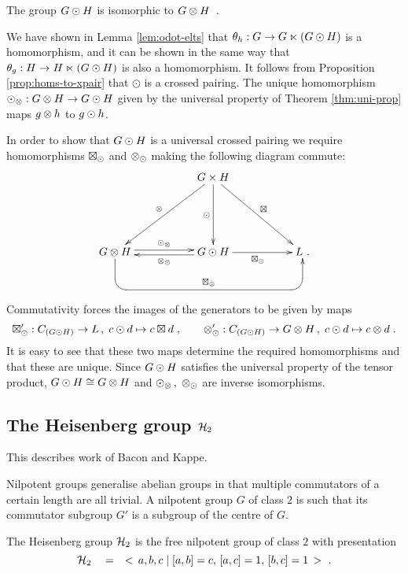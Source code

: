 \begin{thm}
The group  $G \odot H$  is isomorphic to  $G \otimes H$~.
\end{thm}
\begin{pf}
We have shown in Lemma \ref{lem:odot-elts} that  
$\theta_h : G \to G \ltimes (G \odot H)$  is a homomorphism,
and it can be shown in the same way that  
$\theta_g : H \to H \ltimes (G \odot H)$  is also a homomorphism.  
It follows from Proposition \ref{prop:homs-to-xpair}
that  $\odot$  is a crossed pairing.
The unique homomorphism  $\odot_{\otimes} : G \otimes H \to G \odot H$
given by the universal property of Theorem \ref{thm:uni-prop}
maps  $g \otimes h$  to  $g \odot h$.

In order to show that  $G \odot H$  is a universal crossed pairing
we require homomorphisms  $\boxtimes_{\odot}$  and  $\otimes_{\odot}$
making the following diagram commute:
$$
\xymatrix{ 
   &&  \ugxh \ar[ddll]_{\ot} \ar[dd]_{\odot} \ar[ddrr]^{\bt}
      &&  \\
   && &&  \\
 \ugth  \ar[rr]<+0.5ex>^{\odot_{\ot}}
   \ar `d[1,4] `[rrrr]^{\bt_{\ot}} [rrrr]
   &&  \ugoh  \ar[ll]<+0.5ex>^{\ot_{\odot}} \ar[rr]_{\bt_{\odot}}
      &&  L ~. \\
   && &&
}
$$
Commutativity forces the images of the generators to be given by maps
$$
\boxtimes'_{\odot} : C_{(G \odot H)} \to L\,,\;      c \odot d \mapsto c \boxtimes d\;, \qquad
\otimes'_{\odot} : C_{(G \odot H)} \to G \otimes H\,,\;  c \odot d \mapsto c \otimes d\;.
$$
It is easy to see that these two maps determine the required homomorphisms
and that these are unique.
Since  $G \odot H$  satisfies the universal property of the tensor product,
$G \odot H \cong G \otimes H$  and 
$\odot_{\otimes}\,,\;\otimes_{\odot}$  are inverse isomorphisms.
\end{pf}



\subsection{The Heisenberg group $\mathcal{H}_2$}

This describes work of Bacon and Kappe.

Nilpotent groups generalise abelian groups in that multiple commutators
of a certain length are all trivial.
A nilpotent group  $G$  of class $2$ is such that its commutator subgroup
$G'$  is a subgroup of the centre of  $G$.

The Heisenberg group  $\mathcal{H}_2$  is the free nilpotent group of class $2$
with presentation
$$
\mathcal{H}_2 \quad = \quad <\,a,b,c \;|\; [a,b]=c,\,[a,c]=1,\,[b,c]=1\,>~.
$$

